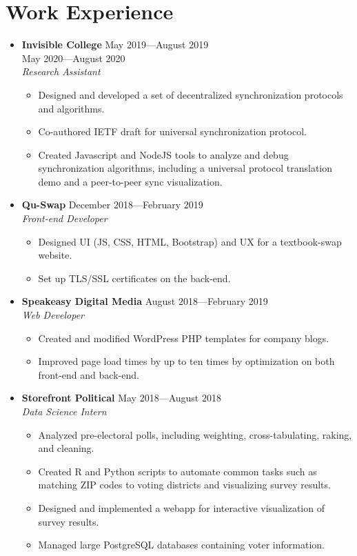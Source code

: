 \documentclass[12pt,letterpaper]{article}
\newenvironment{explist}
{\begin{itemize}[label=\textbf{--},itemsep=1pt,topsep=0pt,partopsep=0pt,parsep=0pt]}
{\end{itemize}}
\begin{document}
\section*{Work Experience} \vspace{-0.5em}
\begin{itemize}[label=,itemsep=0pt]
	\item 
	\textbf{Invisible College} \hfill May 2019---August 2019\\
    \hfill May 2020---August 2020\\
	\textit{Research Assistant}
	\begin{explist}
		\item Designed and developed a set of decentralized synchronization protocols and algorithms.
		\item Co-authored IETF draft for universal synchronization protocol.
		\item Created Javascript and NodeJS tools to analyze and debug synchronization algorithms, including a universal protocol translation demo and a peer-to-peer sync visualization.
	\end{explist}

	\item
	\textbf{Qu-Swap} \hfill December 2018---February 2019\\
	\textit{Front-end Developer}
	\begin{explist}
		\item Designed UI (JS, CSS, HTML, Bootstrap) and UX for a textbook-swap website.
		\item Set up TLS/SSL certificates on the back-end.
	\end{explist}

	\item
	\textbf{Speakeasy Digital Media} \hfill August 2018---February 2019\\
	\textit{Web Developer}
	\begin{explist}
		\item Created and modified WordPress PHP templates for company blogs.
		\item Improved page load times by up to ten times by optimization on both front-end and back-end.
	\end{explist}
	
	\item
	\textbf{Storefront Political} \hfill May 2018---August 2018\\
	\textit{Data Science Intern}
	\begin{explist}
		\item Analyzed pre-electoral polls, including weighting, cross-tabulating, raking, and cleaning.
		\item Created R and Python scripts to automate common tasks such as matching ZIP codes to voting districts and visualizing survey results.
		\item Designed and implemented a webapp for interactive visualization of survey results.
		\item Managed large PostgreSQL databases containing voter information.
	\end{explist}


\end{itemize}
\end{document}
